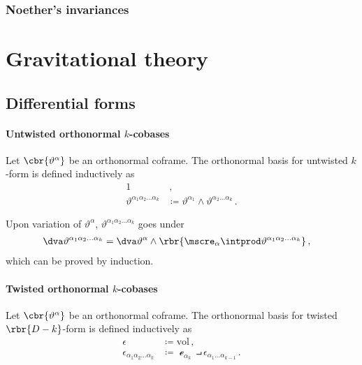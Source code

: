 \documentclass[a4paper]{article}
\begin{document}
\subsubsection{Noether's invariances}
\cite{Avery2015}


\section{Gravitational theory}


\subsection{Differential forms}


\paragraph{Untwisted orthonormal $k$-cobases}
Let $\cbr{\vartheta^{\alpha}}$ be an orthonormal coframe. The orthonormal 
basis for untwisted $k$-form is defined inductively as
\begin{align}
1&\,, \\
\vartheta^{\alpha_{1}\alpha_{2}\ldots \alpha_{k}} &\coloneqq 
	\vartheta^{\alpha_{1}} \wedge \vartheta^{\alpha_{2}\ldots \alpha_{k}}\,.
\end{align}

Upon variation of $\vartheta^{\alpha}$, $\vartheta^{\alpha_{1}\alpha_{2}\ldots 
\alpha_{k}}$ goes under
\begin{align}
\dva \vartheta^{\alpha_{1}\alpha_{2}\ldots \alpha_{k}} &=
\dva \vartheta^{\alpha} \wedge \rbr{\mscre_{\alpha}\intprod 
	\vartheta^{\alpha_{1}\alpha_{2}\ldots \alpha_{k}}}\,,
\end{align}
which can be proved by induction.

\paragraph{Twisted orthonormal $k$-cobases}
Let $\cbr{\vartheta^{\alpha}}$ be an orthonormal coframe. The orthonormal 
basis for twisted $\rbr{D-k}$-form is defined inductively as
\begin{align}
\epsilon &\coloneqq \mathrm{vol}\,, \\
\epsilon_{\alpha_{1}\alpha_{2}\ldots \alpha_{k}} &\coloneqq
\mscre_{\alpha_{k}} \intprod \epsilon_{\alpha_{1}\ldots \alpha_{k-1}}\,.
\end{align}
\end{document}
